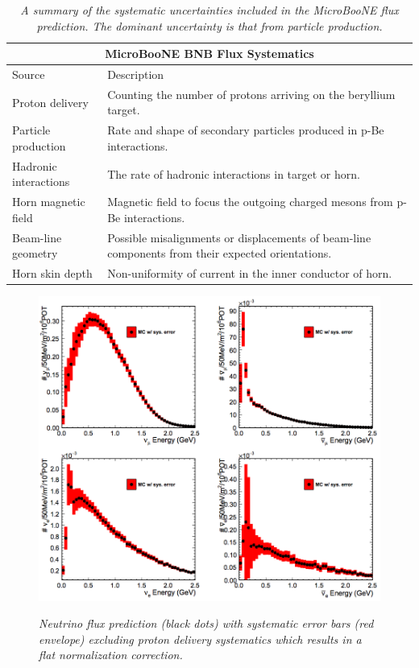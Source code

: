 \begin{table}
\begin{tabular}{ |p{4cm}|p{10cm}|  }
 \hline
 \multicolumn{2}{|c|}{MicroBooNE BNB Flux Systematics} \\
 \hline
 Source & Description \\
 \hline \hline
 Proton delivery & Counting the number of protons arriving on the beryllium target. \\\hline
 Particle production & Rate and shape of secondary particles produced in p-Be interactions. \\\hline
 Hadronic interactions & The rate of hadronic interactions in target or horn. \\\hline
 Horn magnetic field & Magnetic field to focus the outgoing charged mesons from p-Be interactions. \\\hline
 Beam-line geometry & Possible misalignments or displacements of beam-line components from their expected orientations. \\\hline
 Horn skin depth & Non-uniformity of current in the inner conductor of horn. \\\hline 
 \hline
\end{tabular}
\caption{\textit{A summary of the systematic uncertainties included in the MicroBooNE flux prediction. The dominant uncertainty is that from particle production.}}\label{flux_sys_uncerts}
\end{table}


\begin{figure}[ht!]
\centering
	\includegraphics[width=1.0\textwidth]{Figures/UB_flux_fig.png} \\
\caption{\textit{Neutrino flux prediction (black dots) with systematic error bars (red envelope) excluding proton delivery systematics which results in a flat normalization correction.}}\label{UB_flux_fig}
\end{figure}

